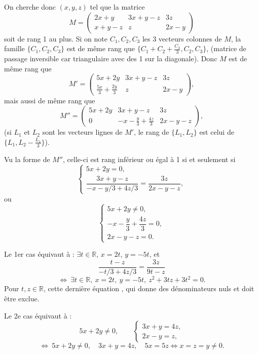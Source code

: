 \begin{enumerate}[label=\arabic*.,leftmargin=2.2em,itemsep=1.2em]
On cherche donc $(x,y,z)$ tel que la matrice
\[
M=\begin{pmatrix}
2x+y&3x+y-z&3z\\
x+y-z&z&2x-y
\end{pmatrix}
\]
soit de rang 1 au plus. Si on note $C_1,C_2,C_3$ les 3 vecteurs colonnes de $M$, la famille $\{C_1,C_2,C_3\}$ est de même rang que $\{C_1+C_2+\frac{C_3}{3},C_2,C_3\}$, (matrice de passage inversible car triangulaire avec des 1 sur la diagonale). Donc $M$ est de même rang que
\[
M'=\begin{pmatrix}
5x+2y&3x+y-z&3z\\
\frac{5x}{3}+\frac{2y}{3}&z&2x-y
\end{pmatrix},
\]
mais aussi de même rang que
\[
M''=\begin{pmatrix}
5x+2y&3x+y-z&3z\\
0&-x-\frac y3+\frac{4z}{3}&2x-y-z
\end{pmatrix},
\]
(si $L_1$ et $L_2$ sont les vecteurs lignes de $M'$, le rang de $\{L_1,L_2\}$ est celui de $\{L_1,L_2-\frac{L_1}{3}\}$).

Vu la forme de $M''$, celle-ci est rang inférieur ou égal à 1 si et seulement si
\[
\begin{cases}
5x+2y=0,\\[0.2em]
\dfrac{3x+y-z}{-x-y/3+4z/3}=\dfrac{3z}{2x-y-z},
\end{cases}
\]
ou
\[
\begin{cases}
5x+2y\ne0,\\
-x-\dfrac y3+\dfrac{4z}{3}=0,\\
2x-y-z=0.
\end{cases}
\]

Le 1er cas équivaut à : $\exists t\in\mathbb R$, $x=2t$, $y=-5t$, et
\[
\frac{t-z}{-t/3+4z/3}=\frac{3z}{9t-z}
\]
\[
\Longleftrightarrow\ \exists t\in\mathbb R,\ x=2t,\ y=-5t,\ z^2+3tz+3t^2=0.
\]
Pour $t,z\in\mathbb R$, cette dernière équation , qui donne des dénominateurs nuls et doit être exclue.

Le 2e cas équivaut à :
\[
5x+2y\ne0,\qquad
\begin{cases}3x+y=4z,\\2x-y=z,
\end{cases}
\]
\[
\Longleftrightarrow\ 5x+2y\ne0,\quad3x+y=4z,\quad5x=5z
\Longleftrightarrow x=z=y\ne0.
\]


\end{enumerate}
